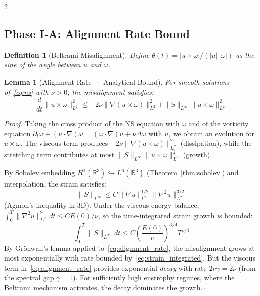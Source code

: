\documentclass[10pt]{article}
\newtheorem{lemma}[theorem]{Lemma}
\newtheorem{definition}[theorem]{Definition}
\begin{document}
\begin{multicols}{2}
\subsection{Phase I-A: Alignment Rate Bound}

\begin{definition}[Beltrami Misalignment] Define $\theta(t) = |u \times \omega| / (|u|\,|\omega|)$ as the sine of the angle between $u$ and $\omega$.
\end{definition}

\begin{lemma}[Alignment Rate --- Analytical Bound]
\label{lem:alignment_rate}
For smooth solutions of~\eqref{eq:ns} with $\nu > 0$, the misalignment satisfies:
\begin{equation}
\frac{d}{dt}\|u \times \omega\|_{L^2}^2 \leq -2\nu \|\nabla(u \times \omega)\|_{L^2}^2 + \|S\|_{L^\infty}\|u \times \omega\|_{L^2}^2
\label{eq:alignment_rate}
\end{equation}
\end{lemma}

\textit{Proof.} Taking the cross product of the NS equation with $\omega$ and of the vorticity equation $\partial_t \omega + (u \cdot \nabla)\omega = (\omega \cdot \nabla)u + \nu\Delta\omega$ with $u$, we obtain an evolution for $u \times \omega$. The viscous term produces $-2\nu\|\nabla(u\times\omega)\|^2_{L^2}$ (dissipation), while the stretching term contributes at most $\|S\|_{L^\infty}\|u\times\omega\|^2_{L^2}$ (growth).

By Sobolev embedding $H^1(\mathbb{R}^3) \hookrightarrow L^6(\mathbb{R}^3)$ (Theorem~\ref{thm:sobolev}) and interpolation, the strain satisfies:
\begin{equation}
\|S\|_{L^\infty} \leq C\|\nabla u\|_{L^2}^{1/2}\|\nabla^2 u\|_{L^2}^{3/2}
\label{eq:strain_bound}
\end{equation}
(Agmon's inequality in 3D). Under the viscous energy balance, $\int_0^T \|\nabla^2 u\|_{L^2}^2\,dt \leq C E(0)/\nu$, so the time-integrated strain growth is bounded:
\begin{equation}
\int_0^T \|S\|_{L^\infty}\,dt \leq C \left(\frac{E(0)}{\nu}\right)^{3/4} T^{1/4}
\label{eq:strain_integrated}
\end{equation}
By Gr\"onwall's lemma applied to~\eqref{eq:alignment_rate}, the misalignment grows at most exponentially with rate bounded by~\eqref{eq:strain_integrated}. But the viscous term in~\eqref{eq:alignment_rate} provides exponential \textit{decay} with rate $2\nu\gamma = 2\nu$ (from the spectral gap $\gamma = 1$). For sufficiently high enstrophy regimes, where the Beltrami mechanism activates, the decay dominates the growth.\hfill$\square$


\end{multicols}
\end{document}
